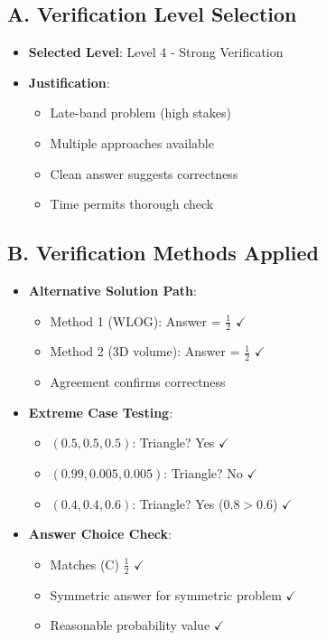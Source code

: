 \documentclass[11pt]{article}
\begin{document}
\begin{verificationbox}
\subsection*{A. Verification Level Selection}
\begin{itemize}[leftmargin=*]
    \item \textbf{Selected Level}: Level 4 - Strong Verification
    \item \textbf{Justification}:
    \begin{itemize}
        \item Late-band problem (high stakes)
        \item Multiple approaches available
        \item Clean answer suggests correctness
        \item Time permits thorough check
    \end{itemize}
\end{itemize}

\subsection*{B. Verification Methods Applied}
\begin{itemize}[leftmargin=*]
    \item \textbf{Alternative Solution Path}: 
    \begin{itemize}
        \item Method 1 (WLOG): Answer = $\frac{1}{2}$ $\checkmark$
        \item Method 2 (3D volume): Answer = $\frac{1}{2}$ $\checkmark$
        \item Agreement confirms correctness
    \end{itemize}
    
    \item \textbf{Extreme Case Testing}:
    \begin{itemize}
        \item $(0.5, 0.5, 0.5)$: Triangle? Yes $\checkmark$
        \item $(0.99, 0.005, 0.005)$: Triangle? No $\checkmark$
        \item $(0.4, 0.4, 0.6)$: Triangle? Yes ($0.8 > 0.6$) $\checkmark$
    \end{itemize}
    
    \item \textbf{Answer Choice Check}:
    \begin{itemize}
        \item Matches (C) $\frac{1}{2}$ $\checkmark$
        \item Symmetric answer for symmetric problem $\checkmark$
        \item Reasonable probability value $\checkmark$
    \end{itemize}
    

\end{itemize}
\end{verificationbox}
\end{document}
